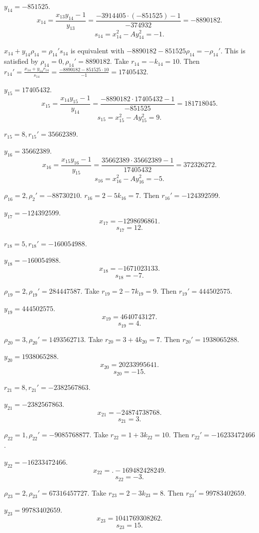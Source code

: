 \documentclass{article}
\theoremstyle{definition}
\theoremstyle{definition}
\begin{document}
$y_{14}=-851525$.
\[
x_{14} = \frac{x_{13}y_{14}-1}{y_{13}} = \frac{-3914405 \cdot (-851525)-1}{-374932} = -8890182.
\]
\[
s_{14} = x_{14}^2 - Ay_{14}^2 =  -1.
\]

$x_{14}+y_{14} \rho_{14} =\rho_{14}'s_{14}$ is equivalent with
$-8890182-851525\rho_{14}= - \rho_{14}'$. This is satisfied by
$\rho_{14}=0, \rho_{14}'=8890182$.
Take $r_{14}=-k_{14} = 10$.
Then $r_{14}'= \frac{x_{14}+y_{14}r_{14}}{s_{14}}
=\frac{-8890182 -851525 \cdot 10}{-1}=17405432$.

$y_{15}=17405432$.
\[
x_{15} = \frac{x_{14}y_{15}-1}{y_{14}} =\frac{-8890182 \cdot 17405432-1}{-851525} = 181718045.
\]
\[
s_{15} = x_{15}^2 - Ay_{15}^2 =  9.
\]

$r_{15}=8, r_{15}'=35662389$.

$y_{16}=35662389$.
\[
x_{16} = \frac{x_{15}y_{16}-1}{y_{15}} =\frac{35662389 \cdot 35662389-1}{17405432} = 372326272.
\]
\[
s_{16} = x_{16}^2 - Ay_{16}^2 =  -5.
\]

$\rho_{16}=2, \rho_2'=-88730210$. 
$r_{16}=2-5k_{16} = 7$. Then $r_{16}'=-124392599$.

$y_{17}=-124392599$.
\[
x_{17} = -1298696861.
\]
\[
s_{17} = 12.
\]

$r_{18}=5, r_{18}'=-160054988$.

$y_{18}=-160054988$.
\[
x_{18} = -1671023133.
\]
\[
s_{18} = -7.
\]

$\rho_{19}=2, \rho_{19}'=284447587$. 
Take $r_{19}=2-7k_{19} = 9$.
Then $r_{19}'=444502575$.

$y_{19}=444502575$.
\[
x_{19} = 4640743127.
\]
\[
s_{19} = 4.
\]

$\rho_{20}=3, \rho_{20}'=1493562713$. Take
$r_{20} = 3+4k_{20} = 7$. Then
$r_{20}' = 1938065288$.


$y_{20}=1938065288$.
\[
x_{20} = 20233995641.
\]
\[
s_{20} = -15.
\]

$r_{21}=8, r_{21}'=-2382567863$. 

$y_{21}=-2382567863$.
\[
x_{21} = -24874738768.
\]
\[
s_{21} = 3.
\]

$\rho_{22}=1, \rho_{22}'=-9085768877$.
Take $r_{22}=1+3k_{22} = 10$.  Then
$r_{22}'=-16233472466$.

$y_{22}=-16233472466$.
\[
x_{22} = .-169482428249.
\]
\[
s_{22} = -3.
\]

$\rho_{23}=2, \rho_{23}'=67316457727$.
Take $r_{23}=2-3k_{23}=8$. Then
$r_{23}'=99783402659$.

$y_{23}=99783402659$.
\[
x_{23} = 1041769308262.
\]
\[
s_{23} = 15.
\]
\end{document}
